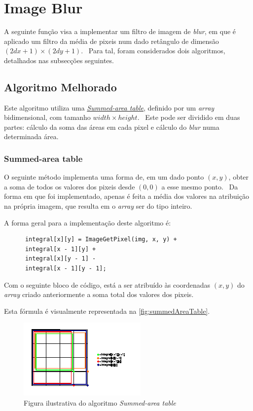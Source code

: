 
\section{Image Blur}\label{sec:imageblur}
    \par A seguinte função visa a implementar um filtro de imagem de \textit{blur}, em que é aplicado um filtro da média de pixeis num dado retângulo de dimensão $(2dx + 1) \times (2dy + 1)$. \ Para tal, foram considerados dois algoritmos, detalhados nas subsecções seguintes.

\subsection{Algoritmo Melhorado}\label{subsec:blur1}
    \par Este algoritmo utiliza uma \href{https://en.wikipedia.org/wiki/Summed-area_table}{\textit{Summed-area table}}, definido por um \textit{array} bidimensional, com tamanho $width \times height$. \ Este pode ser dividido em duas partes: cálculo da soma das áreas em cada pixel e cálculo do \textit{blur} numa determinada área.

\subsubsection{Summed-area table}
    \par O seguinte método implementa uma forma de, em um dado ponto $(x,y)$, obter a soma de todos os valores dos pixeis desde $(0,0)$ a esse mesmo ponto. \ Da forma em que foi implementado, apenas é feita a média dos valores na atribuição na própria imagem, que resulta em o \textit{array} ser do tipo inteiro.

    \par A forma geral para a implementação deste algoritmo é:

    \begin{lstlisting}
      integral[x][y] = ImageGetPixel(img, x, y) +
      integral[x - 1][y] +
      integral[x][y - 1] -
      integral[x - 1][y - 1];    
    \end{lstlisting}

    \par Com o seguinte bloco de código, está a ser atribuído às coordenadas $(x,y)$ do \textit{array} criado anteriormente a soma total dos valores dos pixeis.
    \par Esta fórmula é visualmente representada na \autoref{fig:summedAreaTable}.

    \begin{figure} [H]
        \centering
        \includegraphics[scale=3]{images/sumareas.pdf}
        \caption{Figura ilustrativa do algoritmo \textit{Summed-area table}} 
        \label{fig:summedAreaTable}
    \end{figure}

